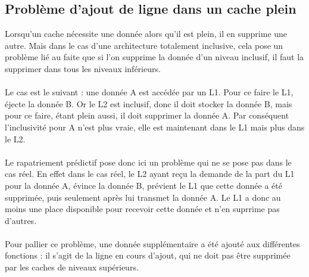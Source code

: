 \subsection{Problème d'ajout de ligne dans un cache plein}

Lorsqu'un cache nécessite une donnée alors qu'il est plein, il en supprime une autre. Mais dans le cas d'une architecture totalement inclusive, cela pose un problème lié au faite que si l'on supprime la donnée d'un niveau inclusif, il faut la supprimer dans tous les niveaux inférieurs.

\paragraph{}
Le cas est le suivant : une donnée A est accédée par un L1. Pour ce faire le L1, éjecte la donnée B. Or le L2 est inclusif, donc il doit stocker la donnée B, mais pour ce faire, étant plein aussi, il doit supprimer la donnée A. Par conséquent l'inclusivité pour A n'est plus vraie, elle est maintenant dans le L1 mais plus dans le L2. 

\paragraph{}
Le rapatriement prédictif pose donc ici un problème qui ne se pose pas dans le cas réel. En effet dans le cas réel, le L2 ayant reçu la demande de la part du L1 pour la donnée A, évince la donnée B, prévient le L1 que cette donnée a été supprimée, puis seulement après lui transmet la donnée A. Le L1 a donc au moins une place disponible pour recevoir cette donnée et n'en suprrime pas d'autres. 

\paragraph{}
Pour pallier ce problème, une donnée supplémentaire a été ajouté aux différentes fonctions : il s'agit de la ligne en cours d'ajout, qui ne doit pas être supprimée par les caches de niveaux supérieurs.


